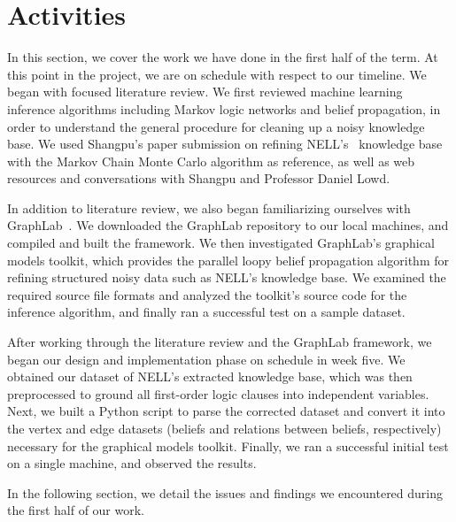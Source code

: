 \section{Activities}
In this section, we cover the work we have done in the first half of the term.
At this point in the project, we are on schedule with respect to our timeline.
We began with focused literature review.
We first reviewed machine learning inference algorithms including Markov logic networks
and belief propagation, in order to understand the general procedure for cleaning
up a noisy knowledge base.
We used Shangpu's paper submission on refining NELL's~\cite{carlson2010toward} knowledge base with the Markov Chain Monte Carlo algorithm as reference,
as well as web resources and conversations with Shangpu and Professor Daniel Lowd.

In addition to literature review, we also began familiarizing ourselves with GraphLab~\cite{low2010graphlab}.
We downloaded the GraphLab repository to our local machines, and compiled and built the framework.
We then investigated GraphLab's graphical models toolkit, 
which provides the parallel loopy belief propagation algorithm for refining structured noisy data such as NELL's knowledge base.
We examined the required source file formats and analyzed the toolkit's source code for the inference algorithm,
and finally ran a successful test on a sample dataset.

After working through the literature review and the GraphLab framework,
we began our design and implementation phase on schedule in week five.
We obtained our dataset of NELL's extracted knowledge base,
which was then preprocessed to ground all first-order logic clauses
into independent variables.
Next, we built a Python script to parse the corrected dataset
and convert it into the vertex and edge datasets (beliefs and relations between beliefs, respectively) necessary for the graphical models toolkit.
Finally, we ran a successful initial test on a single machine, and observed the results.

In the following section, we detail the issues and findings we encountered during the first half of our work.
